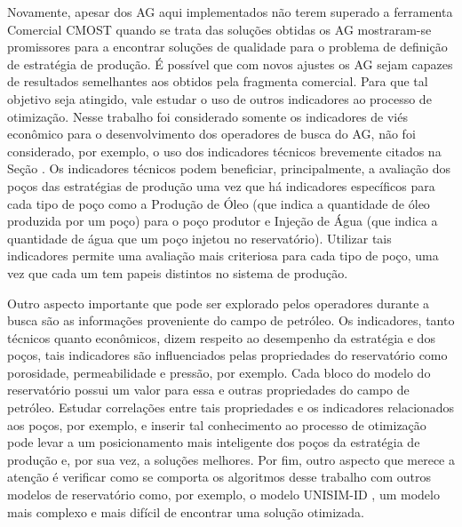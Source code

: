 Novamente, apesar dos AG aqui implementados não terem superado a ferramenta Comercial CMOST quando se trata das soluções obtidas os AG mostraram-se promissores para a encontrar soluções de qualidade para o problema de definição de estratégia de produção. É possível que com novos ajustes os AG sejam capazes de resultados semelhantes aos obtidos pela fragmenta comercial.  Para que tal objetivo seja atingido, vale estudar o uso de outros indicadores ao processo de otimização. Nesse trabalho foi considerado somente os indicadores de viés econômico para o desenvolvimento dos operadores de busca do AG, não foi considerado, por exemplo, o uso dos indicadores técnicos brevemente citados na Seção  . Os indicadores técnicos podem beneficiar, principalmente, a avaliação dos poços das estratégias de produção uma vez que há indicadores específicos para cada tipo de poço como a Produção de Óleo (que indica a quantidade de óleo produzida por um poço) para o poço produtor e Injeção de Água (que indica a quantidade de água que um poço injetou no reservatório). Utilizar tais indicadores permite uma avaliação mais criteriosa para cada tipo de poço, uma vez que cada um tem papeis distintos no sistema de produção. 

Outro aspecto importante que pode ser explorado pelos operadores durante a busca são as informações proveniente do campo de petróleo. Os indicadores, tanto técnicos quanto econômicos, dizem respeito ao desempenho da estratégia e dos poços, tais indicadores são influenciados pelas propriedades do reservatório como porosidade, permeabilidade e pressão, por exemplo. Cada bloco do modelo do reservatório possui um valor para essa e outras propriedades do campo de petróleo. Estudar correlações entre tais propriedades e os indicadores relacionados aos poços, por exemplo, e inserir tal conhecimento ao processo de otimização pode levar a um posicionamento mais inteligente dos poços da estratégia de produção e, por sua vez, a soluções melhores. Por fim, outro aspecto que merece a atenção é verificar como se comporta os algoritmos desse trabalho com outros modelos de reservatório como, por exemplo, o modelo UNISIM-ID \cite{GasparRavagnani2015}, um modelo mais complexo e mais difícil de encontrar uma solução otimizada.
